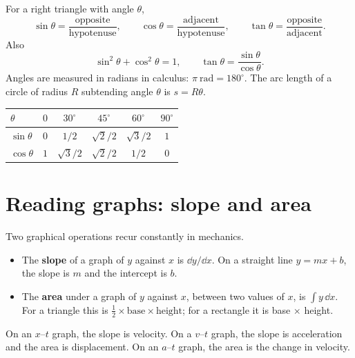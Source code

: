 For a right triangle with angle $\theta$,
\[
\sin\theta=\frac{\text{opposite}}{\text{hypotenuse}},\qquad
\cos\theta=\frac{\text{adjacent}}{\text{hypotenuse}},\qquad
\tan\theta=\frac{\text{opposite}}{\text{adjacent}}.
\]
Also
\[
\sin^2\theta+\cos^2\theta=1,\qquad
\tan\theta=\frac{\sin\theta}{\cos\theta}.
\]
Angles are measured in radians in calculus: $\pi\ \mathrm{rad}=180^\circ$. The
arc length of a circle of radius $R$ subtending angle $\theta$ is $s=R\theta$.

\begin{center}
\renewcommand{\arraystretch}{1.2}
\begin{tabular}{@{}lccccc@{}}
\toprule
$\theta$ & $0$ & $30^\circ$ & $45^\circ$ & $60^\circ$ & $90^\circ$ \\
\midrule
$\sin\theta$ & $0$ & $1/2$ & $\sqrt2/2$ & $\sqrt3/2$ & $1$ \\
$\cos\theta$ & $1$ & $\sqrt3/2$ & $\sqrt2/2$ & $1/2$ & $0$ \\
\bottomrule
\end{tabular}
\end{center}

\section{Reading graphs: slope and area}

Two graphical operations recur constantly in mechanics.

\begin{itemize}[leftmargin=1.4em,itemsep=3pt]
  \item The \textbf{slope} of a graph of $y$ against $x$ is $\dd y/\dd x$. On a
        straight line $y=mx+b$, the slope is $m$ and the intercept is $b$.
  \item The \textbf{area} under a graph of $y$ against $x$, between two values of
        $x$, is $\int y\,\dd x$. For a triangle this is $\tfrac12\times\text{base}
        \times\text{height}$; for a rectangle it is base $\times$ height.
\end{itemize}

\begin{keyidea}
On an $x$--$t$ graph, the slope is velocity. On a $v$--$t$ graph, the slope is
acceleration and the area is displacement. On an $a$--$t$ graph, the area is the
change in velocity.
\end{keyidea}

